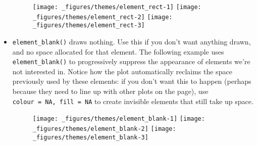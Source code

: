 \begin{itemize}
\begin{Shaded}
\begin{Highlighting}[]
\StringTok{ }\NormalTok{(} \NormalTok{(} \NormalTok{, } \NormalTok{))}
\StringTok{ }\NormalTok{(} \NormalTok{(} \NormalTok{, } \NormalTok{))}
\StringTok{ }\NormalTok{(} \NormalTok{(} \NormalTok{))}
\end{Highlighting}
\end{Shaded}

  \begin{figure}[H]
    \texttt{[image: \_figures/themes/element\_rect-1]}%
    \texttt{[image: \_figures/themes/element\_rect-2]}%
    \texttt{[image: \_figures/themes/element\_rect-3]}
  \end{figure}
\item
  \texttt{element\_blank()} draws nothing. Use this if you don't want
  anything drawn, and no space allocated for that element. The following
  example uses \texttt{element\_blank()} to progressively suppress the
  appearance of elements we're not interested in. Notice how the plot
  automatically reclaims the space previously used by these elements: if
  you don't want this to happen (perhaps because they need to line up
  with other plots on the page), use
  \texttt{colour\ =\ NA,\ fill\ =\ NA} to create invisible elements that
  still take up space. 

\begin{Shaded}
\begin{Highlighting}[]
\NormalTok{() +}\StringTok{ }\NormalTok{(} \NormalTok{())}
\NormalTok{() +}\StringTok{ }\NormalTok{(} \NormalTok{())}
\end{Highlighting}
\end{Shaded}

  \begin{figure}[H]
    \texttt{[image: \_figures/themes/element\_blank-1]}%
    \texttt{[image: \_figures/themes/element\_blank-2]}%
    \texttt{[image: \_figures/themes/element\_blank-3]}
  \end{figure}


\end{itemize}
